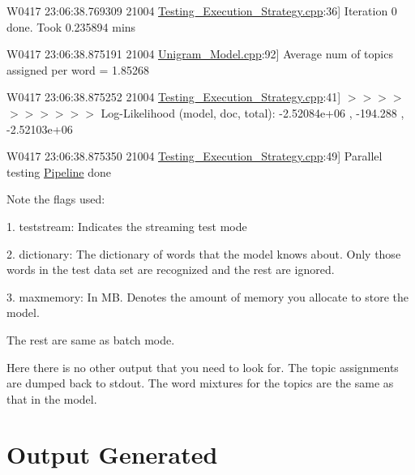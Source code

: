 {\ttfamily W0417 23:06:38.769309 21004 \hyperlink{_testing___execution___strategy_8cpp}{Testing\_\-Execution\_\-Strategy.cpp}:36\mbox{]} Iteration 0 done. Took 0.235894 mins  }

{\ttfamily W0417 23:06:38.875191 21004 \hyperlink{_unigram___model_8cpp}{Unigram\_\-Model.cpp}:92\mbox{]} Average num of topics assigned per word = 1.85268  }

{\ttfamily W0417 23:06:38.875252 21004 \hyperlink{_testing___execution___strategy_8cpp}{Testing\_\-Execution\_\-Strategy.cpp}:41\mbox{]} $>$$>$$>$$>$$>$$>$$>$$>$$>$$>$ Log-\/Likelihood (model, doc, total): -\/2.52084e+06 , -\/194.288 , -\/2.52103e+06  }

{\ttfamily W0417 23:06:38.875350 21004 \hyperlink{_testing___execution___strategy_8cpp}{Testing\_\-Execution\_\-Strategy.cpp}:49\mbox{]} Parallel testing \hyperlink{class_pipeline}{Pipeline} done  }

{\ttfamily \par
  } 

Note the flags used: 

1. teststream: Indicates the streaming test mode 

2. dictionary: The dictionary of words that the model knows about. Only those words in the test data set are recognized and the rest are ignored. 

3. maxmemory: In MB. Denotes the amount of memory you allocate to store the model. 

The rest are same as batch mode. 

\par
  

Here there is no other output that you need to look for. The topic assignments are dumped back to stdout. The word mixtures for the topics are the same as that in the model. \hypertarget{single__machine__usage_generated_output}{}\section{Output Generated}\label{single__machine__usage_generated_output}

